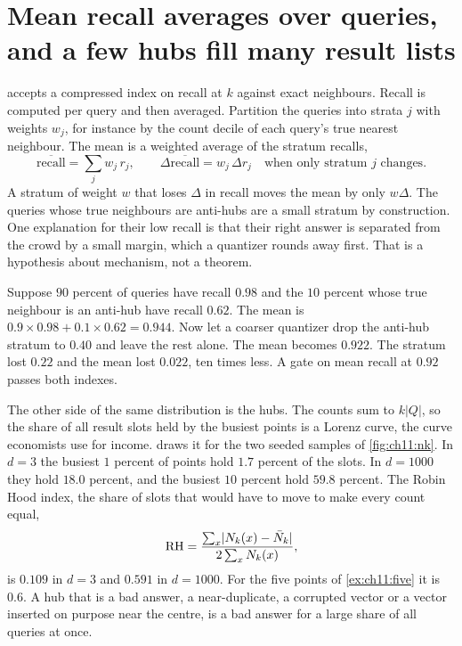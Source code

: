 
\section{Mean recall averages over queries, and a few hubs fill many result lists}\label{sec:ch11:tail}

 accepts a compressed index on recall at $k$ against exact neighbours. Recall is computed per query and then averaged. Partition the queries into strata $j$ with weights $w_j$, for instance by the count decile of each query's true nearest neighbour. The mean is a weighted average of the stratum recalls,
\begin{equation}\label{eq:ch11:strata}
\overline{\mathrm{recall}}=\sum_j w_j\,r_j,\qquad
\Delta\overline{\mathrm{recall}}=w_j\,\Delta r_j\quad\text{when only stratum }j\text{ changes}.
\end{equation}
A stratum of weight $w$ that loses $\Delta$ in recall moves the mean by only $w\Delta$. The queries whose true neighbours are anti-hubs are a small stratum by construction. One explanation for their low recall is that their right answer is separated from the crowd by a small margin, which a quantizer rounds away first. That is a hypothesis about mechanism, not a theorem.

\begin{example}\label{ex:ch11:recall}
Suppose $90$ percent of queries have recall $0.98$ and the $10$ percent whose true neighbour is an anti-hub have recall $0.62$. The mean is $0.9\times0.98+0.1\times0.62=0.944$. Now let a coarser quantizer drop the anti-hub stratum to $0.40$ and leave the rest alone. The mean becomes $0.922$. The stratum lost $0.22$ and the mean lost $0.022$, ten times less. A gate on mean recall at $0.92$ passes both indexes.
\end{example}

The other side of the same distribution is the hubs. The counts sum to $k|Q|$, so the share of all result slots held by the busiest points is a Lorenz curve, the curve economists use for income.  draws it for the two seeded samples of \cref{fig:ch11:nk}. In $d=3$ the busiest $1$ percent of points hold $1.7$ percent of the slots. In $d=1000$ they hold $18.0$ percent, and the busiest $10$ percent hold $59.8$ percent. The Robin Hood index, the share of slots that would have to move to make every count equal,
\begin{equation}\label{eq:ch11:robinhood}
\mathrm{RH}=\frac{\sum_x\lvert N_k(x)-\bar N_k\rvert}{2\sum_xN_k(x)},
\end{equation}
is $0.109$ in $d=3$ and $0.591$ in $d=1000$. For the five points of \cref{ex:ch11:five} it is $0.6$. A hub that is a bad answer, a near-duplicate, a corrupted vector or a vector inserted on purpose near the centre, is a bad answer for a large share of all queries at once.

